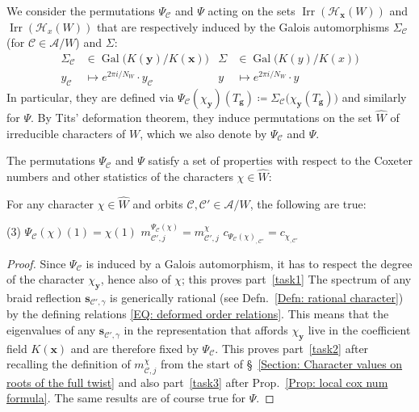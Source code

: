\documentclass[ALCO, Unicode]{cedram}
\newcommand{\op}[1]{\operatorname{#1}}
\newcommand{\op}[1]{\operatorname{#1}}
\begin{document}
\begin{defi}\label{Defn: Malle's character permutations}
We consider the permutations $\Psi_{\mathcal{C}}$ and $\Psi$ acting on the sets $\op{Irr}(\mathcal{H}_{\bm x}(W))$ and $\op{Irr}(\mathcal{H}_x(W))$ that are respectively induced by the Galois automorphisms $\Sigma_{\mathcal{C}}$ (for $\mathcal{C}\in\mathcal{A}/W$) and $\Sigma$:\begin{align*}
\Sigma_{\mathcal{C}}&\in\op{Gal}\big(K(\bm y)/K(\bm x)\big) &\Sigma &\in\op{Gal}\big(K(y)/K(x)\big)\\
y_{\mathcal{C}}&\mapsto e^{2\pi i/N_W}\cdot y_{\mathcal{C}} & y &\mapsto e^{2\pi i/N_W}\cdot y
\end{align*} 
In particular, they are defined via $\Psi_{\mathcal{C}}(\chi_{\bm y})(T_{\bm g})\coloneqq \Sigma_{\mathcal{C}}\big( \chi_{\bm y}(T_{\bm g})\big)$ and similarly for $\Psi$. By Tits' deformation theorem, they induce permutations on the set $\widehat{W}$ of irreducible characters of $W$, which we also denote by $\Psi_{\mathcal{C}}$ and $\Psi$.
\end{defi}

The permutations $\Psi_{\mathcal{C}}$ and $\Psi$ satisfy a set of properties with respect to the Coxeter numbers and other statistics of the characters $\chi\in\widehat{W}$:

\begin{prop}\label{Prop: properties of Psi for Cox numbers}
For any character $\chi\in\widehat{W}$ and orbits $\mathcal{C},\mathcal{C}'\in\mathcal{A}/W$, the following are true:
\begin{tasks}[style=enumerate, after-item-skip=4mm](3)
\task $\displaystyle\Psi_{\mathcal{C}}(\chi)(1)=\chi(1)$\label{task1}
\task $\displaystyle m^{\Psi_{\mathcal{C}}(\chi)}_{\mathcal{C}',j}=m^{\chi}_{\mathcal{C}',j}$\label{task2}
\task $\displaystyle c_{\Psi_{\mathcal{C}}(\chi)_{,\mathcal{C}'}}=c_{\chi_{,\mathcal{C}'}}$\label{task3}
\end{tasks}
\end{prop}
\begin{proof}
Since $\Psi_{\mathcal{C}}$ is induced by a Galois automorphism, it has to respect the degree of the character $\chi_{\bm y}$, hence also of $\chi$; this proves part~\ref{task1} The spectrum of any braid reflection $\bm s_{\mathcal{C}',\gamma}$ is generically rational (see Defn.~\ref{Defn: rational character}) by the defining relations \eqref{EQ: deformed order relations}. This means that the eigenvalues of any $\bm s_{\mathcal{C}',\gamma}$ in the representation that affords $\chi_{\bm y}$ live in the coefficient field $K(\bm x)$ and are therefore fixed by $\Psi_{\mathcal{C}}$. This proves part~\ref{task2} after recalling the definition of $m^{\chi}_{\mathcal{C},j}$ from the start of \S~\ref{Section: Character values on roots of the full twist} and also part~\ref{task3} after Prop.~\ref{Prop: local cox num formula}. The same results are of course true for $\Psi$.
\end{proof}
\end{document}
